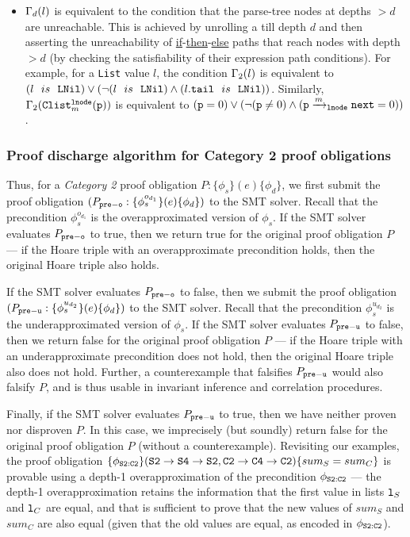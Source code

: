 \begin{itemize}
\item $\Gamma_d(l)$ is equivalent to the condition
that the parse-tree nodes at depths
$>d$ are unreachable. This is achieved by unrolling a \recursiveRelation{}
till depth $d$ and then asserting the unreachability
of
\underline{if}-\underline{then}-\underline{else}
paths that reach nodes with depth $>d$ (by checking the
satisfiability of their expression path conditions).
For example, for a {\tt List} value $l$,
the condition
$\Gamma_2(l)$ is equivalent to
$(l\ \ is\ \ {\tt LNil}) \vee (\neg(l\ \ is\ \ {\tt LNil})\land(l{\tt .tail}\ \ is\ \ {\tt LNil}))$.
Similarly,
$\Gamma_2({\tt Clist}^{{\tt lnode}}_{m}({\tt p}))$
is equivalent to
$({\tt p}=0) \vee (\neg({\tt p}\neq 0)\land({\tt p}\xrightarrow[]{m}_{{\tt lnode}}\mathrm{\tt next}=0))$.
\end{itemize}

\subsubsection{Proof discharge algorithm for Category 2 proof obligations}
\label{sec:cat2algo}
Thus, for a {\em Category 2} proof obligation
$P: \{\phi_s\} (e) \{\phi_d\}$, we first
submit the proof obligation
$(P_{{\tt pre-o}}: \{\phi^{o_{d_1}}_s\} (e) \{\phi_d\})$
to the SMT solver. Recall that the precondition $\phi^{o_{d_1}}_s$
is the overapproximated version
of $\phi_s$.
If the SMT solver evaluates
$P_{{\tt pre-o}}$ to true, then we return true for
the original proof obligation $P$ --- if the
Hoare triple with an overapproximate precondition
holds, then the original Hoare triple
also holds.

If the
SMT solver evaluates
$P_{{\tt pre-o}}$ to false, then we submit
the proof obligation
$(P_{{\tt pre-u}}: \{\phi^{u_{d_2}}_s\} (e) \{\phi_d\})$
to the SMT solver. Recall that the precondition $\phi^{u_{d_2}}_s$
is the underapproximated version of $\phi_s$.
If the SMT solver evaluates
$P_{{\tt pre-u}}$ to false, then we return false for
the original proof obligation $P$ --- if the
Hoare triple with an underapproximate precondition
does not hold, then the original Hoare triple
also does not hold. Further, a counterexample that
falsifies $P_{{\tt pre-u}}$ would also falsify $P$,
and is thus usable in invariant inference and correlation procedures.

Finally, if the SMT solver evaluates
$P_{{\tt pre-u}}$ to true, then we have neither
proven nor disproven $P$. In this case, we
imprecisely (but soundly) return false for the
original proof obligation $P$ (without a counterexample).
Revisiting our examples,
the proof obligation $\{\phi_{{\tt S2:C2}}\} ({\tt S2\rightarrow S4\rightarrow S2}, {\tt C2\rightarrow C4\rightarrow C2}) \\ \{sum_{S} = sum_{C}\}$ is provable using a depth-1 overapproximation of the
precondition $\phi_{{\tt S2:C2}}$ --- the depth-1 overapproximation retains the
information that the first value in lists ${\tt l}_S$
and ${\tt l}_C$ are equal, and that is sufficient to prove that
the new values of $sum_{S}$ and $sum_{C}$ are also equal (given that the
old values are equal, as encoded in $\phi_{{\tt S2:C2}}$).

